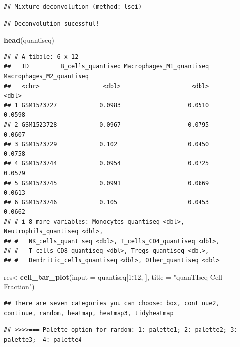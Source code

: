 \documentclass[
  12pt,
]{book}
\newenvironment{Shaded}{\begin{snugshade}}{\end{snugshade}}
\newcommand{\AttributeTok}[1]{\textcolor[rgb]{0.13,0.29,0.53}{#1}}
\newcommand{\DecValTok}[1]{\textcolor[rgb]{0.00,0.00,0.81}{#1}}
\newcommand{\FunctionTok}[1]{\textcolor[rgb]{0.13,0.29,0.53}{\textbf{#1}}}
\newcommand{\NormalTok}[1]{#1}
\newcommand{\OtherTok}[1]{\textcolor[rgb]{0.56,0.35,0.01}{#1}}
\newcommand{\SpecialCharTok}[1]{\textcolor[rgb]{0.81,0.36,0.00}{\textbf{#1}}}
\newcommand{\StringTok}[1]{\textcolor[rgb]{0.31,0.60,0.02}{#1}}
\begin{document}
\begin{verbatim}
## Mixture deconvolution (method: lsei)
\end{verbatim}

\begin{verbatim}
## Deconvolution sucessful!
\end{verbatim}

\begin{Shaded}
\begin{Highlighting}[]
\FunctionTok{head}\NormalTok{(quantiseq)}
\end{Highlighting}
\end{Shaded}

\begin{verbatim}
## # A tibble: 6 x 12
##   ID         B_cells_quantiseq Macrophages_M1_quantiseq Macrophages_M2_quantiseq
##   <chr>                  <dbl>                    <dbl>                    <dbl>
## 1 GSM1523727            0.0983                   0.0510                   0.0598
## 2 GSM1523728            0.0967                   0.0795                   0.0607
## 3 GSM1523729            0.102                    0.0450                   0.0758
## 4 GSM1523744            0.0954                   0.0725                   0.0579
## 5 GSM1523745            0.0991                   0.0669                   0.0613
## 6 GSM1523746            0.105                    0.0453                   0.0662
## # i 8 more variables: Monocytes_quantiseq <dbl>, Neutrophils_quantiseq <dbl>,
## #   NK_cells_quantiseq <dbl>, T_cells_CD4_quantiseq <dbl>,
## #   T_cells_CD8_quantiseq <dbl>, Tregs_quantiseq <dbl>,
## #   Dendritic_cells_quantiseq <dbl>, Other_quantiseq <dbl>
\end{verbatim}

\begin{Shaded}
\begin{Highlighting}[]
\NormalTok{res}\OtherTok{\textless{}{-}}\FunctionTok{cell\_bar\_plot}\NormalTok{(}\AttributeTok{input =}\NormalTok{ quantiseq[}\DecValTok{1}\SpecialCharTok{:}\DecValTok{12}\NormalTok{, ], }\AttributeTok{title =} \StringTok{"quanTIseq Cell Fraction"}\NormalTok{)}
\end{Highlighting}
\end{Shaded}

\begin{verbatim}
## There are seven categories you can choose: box, continue2, continue, random, heatmap, heatmap3, tidyheatmap
\end{verbatim}

\begin{verbatim}
## >>>>=== Palette option for random: 1: palette1; 2: palette2; 3: palette3;  4: palette4
\end{verbatim}
\end{document}
